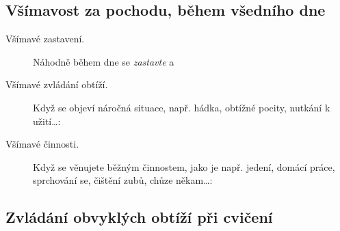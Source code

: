 	\subsection{Všímavost za pochodu, během všedního dne}
		\begin{description}
			\item[ Všímavé zastavení.] Náhodně během dne se \emph{zastavte} a 
			\item[ Všímavé zvládání obtíží.]
				Když se objeví náročná situace, např. hádka, obtížné pocity, nutkání k užití…:
			\item[ Všímavé činnosti.]
				Když se věnujete běžným činnostem, jako je např. jedení, domácí práce, sprchování se, čištění zubů, chůze někam…:
		\end{description}
		\vfill

	\pageBRZDA
	\pagePracticeLog

\subsection{Zvládání obvyklých obtíží při cvičení}

